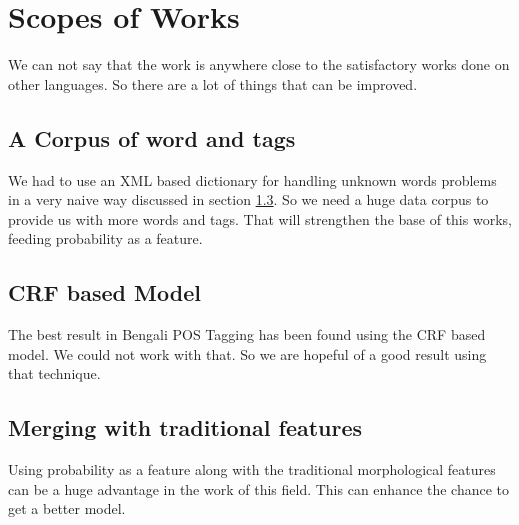 \documentclass{standalone}
\begin{document}
\section{Scopes of Works}
We can not say that the work is anywhere close to the satisfactory works done on other languages. So there are a lot of things that can be improved.
\subsection{A Corpus of word and tags}
We had to use an XML based dictionary for handling unknown words problems in a very naive way discussed in section \ref{}. So we need a huge data corpus to provide us with more words and tags. That will strengthen the base of this works, feeding probability as a feature.

\subsection{CRF based Model}
The best result in Bengali POS Tagging has been found using the CRF based model. We could not work with that. So we are hopeful of a good result using that technique.
\subsection{Merging with traditional features}
Using probability as a feature along with the traditional morphological features can be a huge advantage in the work of this field. This can enhance the chance to get a better model.
\end{document}
